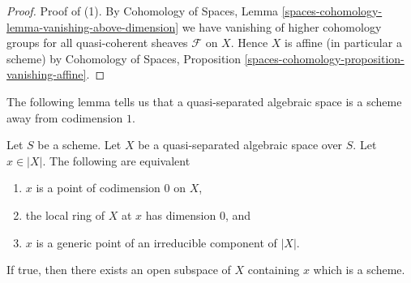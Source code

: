 \begin{proof}
\medskip\noindent
Proof of (1). By Cohomology of Spaces, Lemma
\ref{spaces-cohomology-lemma-vanishing-above-dimension}
we have vanishing of higher cohomology groups for all
quasi-coherent sheaves $\mathcal{F}$ on $X$. Hence $X$
is affine (in particular a scheme) by
Cohomology of Spaces, Proposition
\ref{spaces-cohomology-proposition-vanishing-affine}.
\end{proof}

\noindent
The following lemma tells us that a quasi-separated algebraic space
is a scheme away from codimension $1$.

\begin{lemma}
\label{lemma-generic-point-in-schematic-locus}
Let $S$ be a scheme. Let $X$ be a quasi-separated algebraic space over $S$.
Let $x \in |X|$. The following are equivalent
\begin{enumerate}
\item $x$ is a point of codimension $0$ on $X$,
\item the local ring of $X$ at $x$ has dimension $0$, and
\item $x$ is a generic point of an irreducible component of $|X|$.
\end{enumerate}
If true, then there exists an open subspace of $X$
containing $x$ which is a scheme.
\end{lemma}

